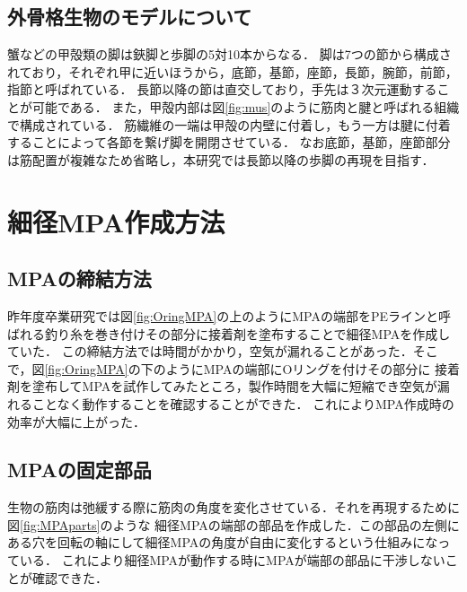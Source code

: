 \documentclass{jarticle}
\begin{document}
\vspace*{-1mm}
\subsection{外骨格生物のモデルについて}

蟹などの甲殻類の脚は鋏脚と歩脚の5対10本からなる．
脚は7つの節から構成されており，それぞれ甲に近いほうから，底節，基節，座節，長節，腕節，前節，指節と呼ばれている\cite{crab}．
長節以降の節は直交しており，手先は３次元運動することが可能である．
また，甲殻内部は図\ref{fig:mus}のように筋肉と腱と呼ばれる組織で構成されている．
筋繊維の一端は甲殻の内壁に付着し，もう一方は腱に付着することによって各節を繋げ脚を開閉させている．
なお底節，基節，座節部分は筋配置が複雑なため省略し，本研究では長節以降の歩脚の再現を目指す．

\vspace*{-2mm}
\section{細径MPA作成方法}

\vspace*{-1mm}
\subsection{MPAの締結方法}

昨年度卒業研究では図\ref{fig:OringMPA}の上のようにMPAの端部をPEラインと呼ばれる釣り糸を巻き付けその部分に接着剤を塗布することで細径MPAを作成していた．
この締結方法では時間がかかり，空気が漏れることがあった．そこで，図\ref{fig:OringMPA}の下のようにMPAの端部にOリングを付けその部分に
接着剤を塗布してMPAを試作してみたところ，製作時間を大幅に短縮でき空気が漏れることなく動作することを確認することができた．
これによりMPA作成時の効率が大幅に上がった．

\vspace*{-1mm}
\subsection{MPAの固定部品}

生物の筋肉は弛緩する際に筋肉の角度を変化させている．それを再現するために図\ref{fig:MPAparts}のような
細径MPAの端部の部品を作成した．この部品の左側にある穴を回転の軸にして細径MPAの角度が自由に変化するという仕組みになっている．
これにより細径MPAが動作する時にMPAが端部の部品に干渉しないことが確認できた．
\end{document}
